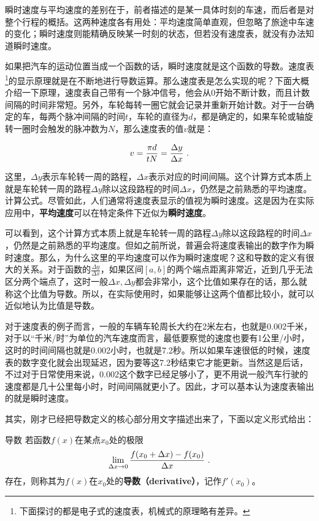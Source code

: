 瞬时速度与平均速度的差别在于，前者描述的是某一具体时刻的车速，而后者是对整个行程的概括。这两种速度各有用处：平均速度简单直观，但忽略了旅途中车速的变化；瞬时速度则能精确反映某一时刻的状态，但若没有速度表，就没有办法知道瞬时速度。

如果把汽车的运动位置当成一个函数的话，瞬时速度就是这个函数的导数。速度表\footnote{下面探讨的都是电子式的速度表，机械式的原理略有差异。}的显示原理就是在不断地进行导数运算。那么速度表是怎么实现的呢？下面大概介绍一下原理，速度表自己带有一个脉冲信号，他会从0开始不断计数，而且计数间隔的时间非常短。另外，车轮每转一圈它就会记录并重新开始计数。对于一台确定的车，每两个脉冲间隔的时间$t$，车轮的直径为$d$，都是确定的，如果车轮或轴旋转一圈时会触发的脉冲数为$N$，那么速度表的值$v$就是：

\begin{equation}
v={\pi d\over tN}=\frac{\Delta y}{\Delta x}~.
\end{equation}

这里，$\Delta y$表示车轮转一周的路程，$\Delta x$表示对应的时间间隔。这个计算方式本质上就是车轮转一周的路程$\Delta y$除以这段路程的时间$\Delta x$，仍然是之前熟悉的平均速度。计算公式。尽管如此，人们通常将速度表显示的值视为瞬时速度。这是因为在实际应用中，\textbf{平均速度}可以在特定条件下近似为\textbf{瞬时速度}。

可以看到，这个计算方式本质上就是车轮转一周的路程$\Delta y$除以这段路程的时间$\Delta x$，仍然是之前熟悉的平均速度。但如之前所说，普遍会将速度表输出的数字作为瞬时速度。那么，为什么这里的平均速度可以作为瞬时速度呢？这和导数的定义有很大的关系。对于函数的$\displaystyle\frac{\Delta y}{\Delta x}$，如果区间$[a, b]$的两个端点距离非常近，近到几乎无法区分两个端点了，这时一般$\Delta x,\Delta y$都会非常小，这个比值如果存在的话，那么就称这个比值为导数。所以，在实际使用时，如果能够让这两个值都比较小，就可以近似地认为比值是导数。

对于速度表的例子而言，一般的车辆车轮周长大约在2米左右，也就是0.002千米，对于以“千米/时”为单位的汽车速度而言，最低要察觉的速度也要有1公里/小时，这时的时间间隔也就是0.002小时，也就是7.2秒。所以如果车速很低的时候，速度表的数字变化就会出现延迟，因为要等这7.2秒结束它才能更新。当然这是后话，不过对于日常使用来说，0.002这个数字已经足够小了，更不用说一般汽车行驶的速度都是几十公里每小时，时间间隔就更小了。因此，才可以基本认为速度表输出的就是瞬时速度。

其实，刚才已经把导数定义的核心部分用文字描述出来了，下面以定义形式给出：

\begin{definition}{导数}
若函数$f(x)$在某点$x_0$处的极限
\begin{equation}
\lim_{\Delta x\to 0}{f(x_0+\Delta x)-f(x_0)\over \Delta x}~.
\end{equation}
存在，则称其为$f(x)$在$x_0$处的\textbf{导数（derivative）}，记作$f'(x_0)$。
\end{definition}

